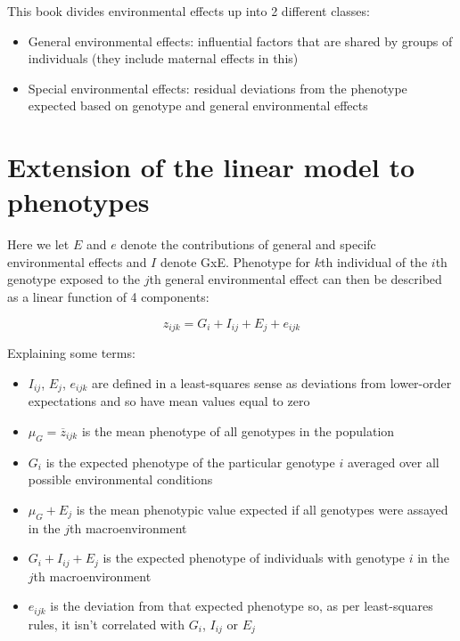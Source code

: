 \documentclass[
]{book}
\providecommand{\tightlist}{%
  \setlength{\itemsep}{0pt}\setlength{\parskip}{0pt}}
\begin{document}
This book divides environmental effects up into 2 different classes:

\begin{itemize}
\tightlist
\item
  General environmental effects: influential factors that are shared by groups of individuals (they include maternal effects in this)
\item
  Special environmental effects: residual deviations from the phenotype expected based on genotype and general environmental effects
\end{itemize}

\hypertarget{extension-of-the-linear-model-to-phenotypes}{%
\section{Extension of the linear model to phenotypes}\label{extension-of-the-linear-model-to-phenotypes}}

Here we let \(E\) and \(e\) denote the contributions of general and specifc environmental effects and \(I\) denote GxE. Phenotype for \(k\)th individual of the \(i\)th genotype exposed to the \(j\)th general environmental effect can then be described as a linear function of 4 components:

\begin{equation}
  z_{ijk} = G_{i} + I_{ij} + E_{j} + e_{ijk}
  \label{eq:phenotype-linear-model}
\end{equation}

Explaining some terms:

\begin{itemize}
\tightlist
\item
  \(I_{ij}\), \(E_{j}\), \(e_{ijk}\) are defined in a least-squares sense as deviations from lower-order expectations and so have mean values equal to zero
\item
  \(\mu_{G} = \overline{z}_{ijk}\) is the mean phenotype of all genotypes in the population
\item
  \(G_i\) is the expected phenotype of the particular genotype \(i\) averaged over all possible environmental conditions
\item
  \(\mu_G + E_{j}\) is the mean phenotypic value expected if all genotypes were assayed in the \(j\)th macroenvironment
\item
  \(G_i + I_{ij} + E_{j}\) is the expected phenotype of individuals with genotype \(i\) in the \(j\)th macroenvironment
\item
  \(e_{ijk}\) is the deviation from that expected phenotype so, as per least-squares rules, it isn't correlated with \(G_i\), \(I_{ij}\) or \(E_{j}\)
\end{itemize}
\end{document}
